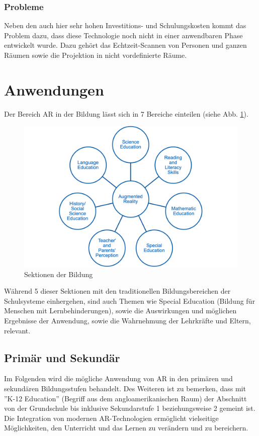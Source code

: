 \documentclass[conference]{IEEEtran}
\begin{document}
\subsubsection*{Probleme}
Neben den auch hier sehr hohen Investitions- und Schulungskosten kommt das Problem dazu, dass diese Technologie noch nicht in einer 
anwendbaren Phase entwickelt wurde. Dazu gehört das Echtzeit-Scannen von Personen und ganzen Räumen sowie die Projektion in nicht vordefinierte Räume.

\section{Anwendungen}
Der Bereich AR in der Bildung lässt sich in 7 Bereiche einteilen (siehe Abb. \ref{fig3}).

\begin{figure}[htbp]
    \centerline{\includegraphics[scale=0.3]{img/sections.png}}
    \caption{Sektionen der Bildung \cite{b4}}
    \label{fig3}
\end{figure}

Während 5 dieser Sektionen mit den traditionellen Bildungsbereichen der Schulsysteme einhergehen, sind 
auch Themen wie Special Education (Bildung für Menschen mit Lernbehinderungen), sowie die Auswirkungen
und möglichen Ergebnisse der Anwendung, sowie die Wahrnehmung der Lehrkräfte und Eltern, relevant.

\subsection{Primär und Sekundär}
Im Folgenden wird die mögliche Anwendung von AR in den primären und sekundären Bildungsstufen behandelt.
Des Weiteren ist zu bemerken, dass mit ''K-12 Education'' (Begriff aus dem angloamerikanischen Raum) der Abschnitt von der Grundschule bis inklusive Sekundarstufe 1 beziehungsweise 2 gemeint ist. Die Integration von modernen AR-Technologien ermöglicht vielseitige Möglichkeiten, den Unterricht und das Lernen zu verändern und zu bereichern.
\end{document}
